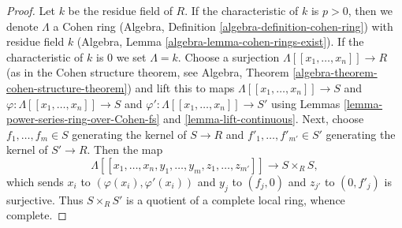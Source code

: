 \documentclass[10pt,a4paper]{amsart}
\theoremstyle{plain}
\theoremstyle{definition}
\theoremstyle{remark}
\numberwithin{equation}{subsection}
\begin{document}
\begin{proof}
Let $k$ be the residue field of $R$. If the characteristic of
$k$ is $p > 0$, then we denote $\Lambda$ a Cohen ring
(Algebra, Definition \ref{algebra-definition-cohen-ring})
with residue field $k$ (Algebra, Lemma \ref{algebra-lemma-cohen-rings-exist}).
If the characteristic of $k$ is $0$ we set $\Lambda = k$.
Choose a surjection $\Lambda[[x_1, \ldots, x_n]] \to R$
(as in the Cohen structure theorem, see
Algebra, Theorem \ref{algebra-theorem-cohen-structure-theorem})
and lift this to maps $\Lambda[[x_1, \ldots, x_n]] \to S$ and
$\varphi : \Lambda[[x_1, \ldots, x_n]] \to S$ and
$\varphi' : \Lambda[[x_1, \ldots, x_n]] \to S'$ using
Lemmas \ref{lemma-power-series-ring-over-Cohen-fs} and
\ref{lemma-lift-continuous}.
Next, choose $f_1, \ldots, f_m \in S$ generating the kernel
of $S \to R$ and $f'_1, \ldots, f'_{m'} \in S'$ generating the
kernel of $S' \to R$. Then the map
$$
\Lambda[[x_1, \ldots, x_n, y_1, \ldots, y_m, z_1, \ldots, z_{m'}]]
\longrightarrow S \times_R S,
$$
which sends $x_i$ to $(\varphi(x_i), \varphi'(x_i))$ and
$y_j$ to $(f_j, 0)$ and
$z_{j'}$ to $(0, f'_j)$
is surjective. Thus $S \times_R S'$ is a quotient of a complete
local ring, whence complete.
\end{proof}
\end{document}
